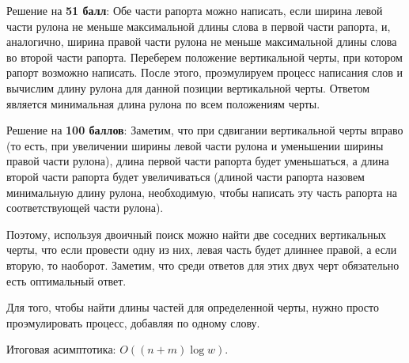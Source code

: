 Решение на \textbf{51 балл}: Обе части рапорта можно написать, если ширина левой части рулона не меньше максимальной длины слова в первой части рапорта, 
и, аналогично, ширина правой части рулона не меньше максимальной длины слова во второй части рапорта. Переберем положение вертикальной черты, при котором рапорт возможно написать. После этого, проэмулируем процесс написания слов и вычислим длину рулона для данной позиции вертикальной черты. Ответом является минимальная длина рулона по всем положениям черты.

Решение на \textbf{100 баллов}:
Заметим, что при сдвигании вертикальной черты вправо (то есть, при увеличении ширины левой части рулона и уменьшении ширины правой части рулона),
длина первой части рапорта будет уменьшаться, а длина второй части рапорта будет увеличиваться (длиной части рапорта назовем минимальную длину рулона, 
необходимую, чтобы написать эту часть рапорта на соответствующей части рулона).

Поэтому, используя двоичный поиск можно найти две соседних вертикальных черты, что если провести одну из них, левая часть будет длиннее правой, 
а если вторую, то наоборот.
Заметим, что среди ответов для этих двух черт обязательно есть оптимальный ответ.

Для того, чтобы найти длины частей для определенной черты, нужно просто проэмулировать процесс, добавляя по одному слову.

Итоговая асимптотика: $O((n + m) \log w)$.